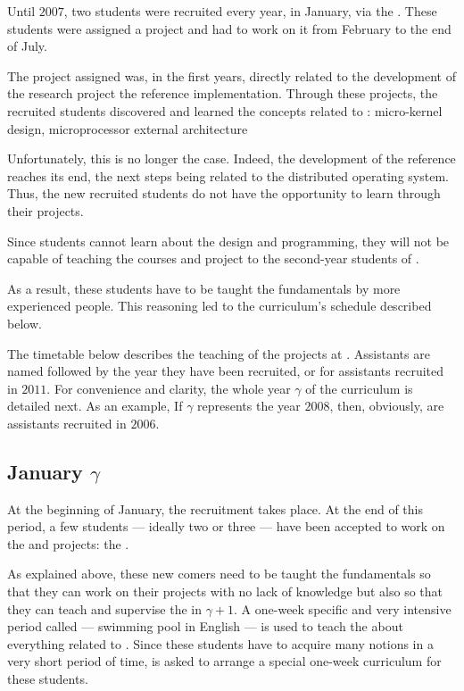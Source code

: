 \begin{multicols}{2}
Until $2007$, two students were recruited every year, in January, via the
. These students were assigned a
project and had to work on it from February to the end of July.

The project assigned was, in the first years, directly related to the
development of the  research project \ie{} the reference
implementation. Through these projects, the recruited students discovered
and learned the concepts related to : micro-kernel design,
 microprocessor external architecture \etc{}

Unfortunately, this is no longer the case. Indeed, the development of the
 reference reaches its end, the next steps being related to the
 distributed operating system. Thus, the new recruited students
do not have the opportunity to learn through their projects.

Since students cannot learn about the  design and 
programming, they will not be capable of teaching the  courses
and project to the second-year students of .

As a result, these students have to be taught the fundamentals by more
experienced  people. This reasoning led to the curriculum's
schedule described below.

The timetable below describes the teaching of the 
projects at . Assistants are named  followed by the
year they have been recruited,  or  for
assistants recruited in $2011$. For convenience and clarity, the whole year
$\gamma$ of the  curriculum is detailed next. As an example,
If $\gamma$ represents the year $2008$, then, obviously,
 are assistants recruited in $2006$.

%
%

\subsection{January $\gamma$}

At the beginning of January, the 
recruitment takes place. At the end of this period, a few students ---
ideally two or three --- have been accepted to work on the
 and  projects: the .

As explained above, these new comers need to be taught the fundamentals so
that they can work on their projects with no lack of knowledge but also so
that they can teach and supervise the 
in $\gamma + 1$. A one-week specific and very intensive period called
 --- swimming pool in English --- is used to teach
the  about everything related to .
Since these students have to acquire many notions in a very short period of
time,  is asked to arrange a special one-week curriculum for
these students.


\end{multicols}
